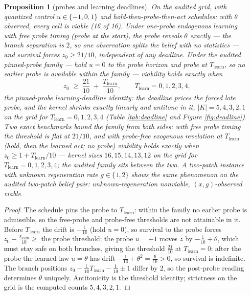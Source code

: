 \documentclass[10pt,twocolumn]{article}
\theoremstyle{plain}
\newtheorem{proposition}[theorem]{Proposition}
\theoremstyle{definition}
\theoremstyle{remark}
\begin{document}
\begin{proposition}[probes and learning deadlines]\label{prop:learn}
On the audited grid, with quantized control \(u \in \{-1, 0, 1\}\) and
hold-then-probe-then-act schedules: with \(\theta\) observed, every cell
is viable (16 of 16). Under one-probe endogenous learning with free probe timing (probe at
the start), the probe
reveals \(\theta\) exactly --- the branch separation is \(2\), so one
observation splits the belief with no statistics --- and survival forces
\(z_{0} \ge 21/10\), independent of any deadline. Under the audited
pinned-probe family --- hold \(u = 0\) to the probe horizon and probe
at \(T_{\mathrm{learn}}\), so no earlier probe is available within the
family --- viability holds exactly when
\[
z_{0} \;\ge\; \frac{21}{10} \;+\; \frac{T_{\mathrm{learn}}}{10},
\qquad T_{\mathrm{learn}} = 0, 1, 2, 3, 4,
\]
the pinned-probe learning-deadline identity: the deadline prices the
forced late probe, and the kernel shrinks exactly
linearly and antitone in it, \(|K| = 5, 4, 3, 2, 1\) on the grid for
\(T_{\mathrm{learn}} = 0, 1, 2, 3, 4\) (Table \ref{tab:deadline} and
Figure \ref{fig:deadline}). Two exact benchmarks bound the family from
both sides: with free probe timing the threshold is flat at
\(21/10\), and with probe-free exogenous revelation at
\(T_{\mathrm{learn}}\) (hold, then the learned act; no probe)
viability holds exactly when \(z_{0} \ge 1 + T_{\mathrm{learn}}/10\)
--- kernel sizes \(16, 15, 14, 13, 12\) on the grid for
\(T_{\mathrm{learn}} = 0, 1, 2, 3, 4\); the audited family sits
between the two. A two-patch instance with unknown
regeneration rate \(g \in \{1, 2\}\) shows the same phenomenon on the
audited two-patch belief pair: unknown-regeneration nonviable,
\((x, g)\)-observed viable.
\end{proposition}

\begin{proof}
The schedule pins the probe to \(T_{\mathrm{learn}}\): within the
family no earlier probe is admissible, so the free-probe and probe-free
thresholds are not attainable in it. Before \(T_{\mathrm{learn}}\) the
drift is \(-\tfrac{1}{10}\) (hold
\(u=0\)), so survival to the probe forces
\(z_{0}-\tfrac{T_{\mathrm{learn}}}{10}\ge\) the probe threshold; the
probe \(u=+1\) moves \(z\) by \(-\tfrac{1}{10}+\theta\), which must stay
safe on both branches, giving the threshold \(\tfrac{21}{10}\) at
\(T_{\mathrm{learn}}=0\); after the probe the learned law \(u=\theta\)
has drift \(-\tfrac{1}{10}+\theta^2=\tfrac{9}{10}>0\), so survival is
indefinite. The branch positions
\(z_{0}-\tfrac{1}{10}T_{\mathrm{learn}}-\tfrac{1}{10}\pm1\) differ by
\(2\), so the post-probe reading determines \(\theta\) uniquely.
Antitonicity is the threshold identity; strictness on the grid is the
computed counts \(5,4,3,2,1\).
\end{proof}
\end{document}
